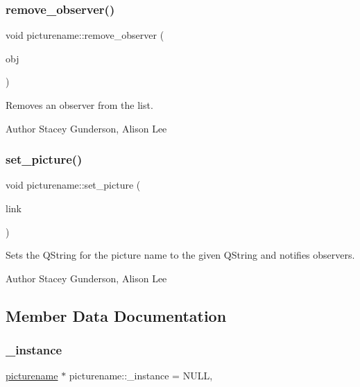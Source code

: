 \subsubsection{\texorpdfstring{remove\+\_\+observer()}{remove\_observer()}}
{\footnotesize\ttfamily void picturename\+::remove\+\_\+observer (\begin{DoxyParamCaption}\item[{\mbox{\hyperlink{classimage}{image}} $\ast$}]{obj }\end{DoxyParamCaption})}



Removes an observer from the list. 

\begin{DoxyAuthor}{Author}
Stacey Gunderson, Alison Lee 
\end{DoxyAuthor}
\mbox{\label{classpicturename_ab96020b531c8e2c852ea4bc17969e36c}} 
\subsubsection{\texorpdfstring{set\+\_\+picture()}{set\_picture()}}
{\footnotesize\ttfamily void picturename\+::set\+\_\+picture (\begin{DoxyParamCaption}\item[{Q\+String}]{link }\end{DoxyParamCaption})}



Sets the Q\+String for the picture name to the given Q\+String and notifies observers. 

\begin{DoxyAuthor}{Author}
Stacey Gunderson, Alison Lee 
\end{DoxyAuthor}


\subsection{Member Data Documentation}
\mbox{\label{classpicturename_ab2f5e20595601416bf9f3e1b65a547d4}} 
\subsubsection{\texorpdfstring{\+\_\+instance}{\_instance}}
{\footnotesize\ttfamily \mbox{\hyperlink{classpicturename}{picturename}} $\ast$ picturename\+::\+\_\+instance = N\+U\+LL\hspace{0.3cm}{\ttfamily [static]}, {\ttfamily [private]}}



